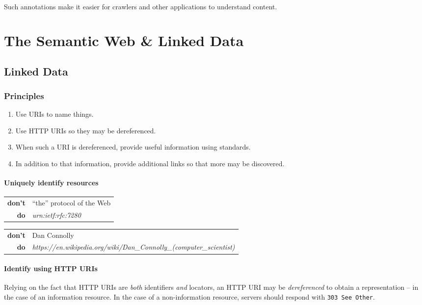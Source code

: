 \documentclass{report}
\begin{document}
Such annotations make it easier for crawlers
and other applications to understand content.

\chapter{The Semantic Web \& Linked Data}

\section{Linked Data}

\subsection{Principles}

\begin{enumerate}
  \item Use URIs to name things.
  \item Use HTTP URIs so they may be dereferenced.
  \item When such a URI is dereferenced,
        provide useful information
        using standards.
  \item In addition to that information,
        provide additional links
        so that more may be discovered.
\end{enumerate}

\subsubsection{Uniquely identify resources}

\begin{tabularx}{\textwidth}{rl}
  \textbf{don't} & ``the'' protocol of the Web\\
  \textbf{do} & \textit{urn:ietf:rfc:7280}\\
\end{tabularx}
\begin{tabularx}{\textwidth}{rl}
  \textbf{don't} & Dan Connolly\\
  \textbf{do} & \textit{https://en.wikipedia.org/wiki/Dan\_Connolly\_(computer\_scientist)}
\end{tabularx}

\subsubsection{Identify using HTTP URIs}

Relying on the fact that HTTP URIs are
\emph{both} identifiers \emph{and} locators,
an HTTP URI may be \emph{dereferenced} to
obtain a representation -- in the case of
an information resource.
In the case of a non-information resource,
servers should respond with \texttt{303 See Other}.
\end{document}
